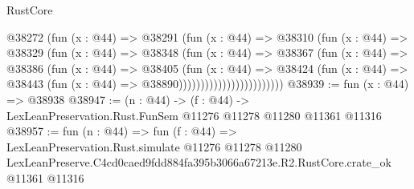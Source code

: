 \begin{lexlean}{RustCore}
\begin{coremodule}
                              @38272
                                (fun (x : @44) =>
                                @38291
                                  (fun (x : @44) =>
                                  @38310
                                    (fun (x : @44) =>
                                    @38329
                                      (fun (x : @44) =>
                                      @38348
                                        (fun (x : @44) =>
                                        @38367
                                          (fun (x : @44) =>
                                          @38386
                                            (fun (x : @44) =>
                                            @38405
                                              (fun (x : @44) =>
                                              @38424
                                                (fun (x : @44) =>
                                                @38443
                                                  (fun (x : @44) => @38890))))))))))))))))))))))))
@38939 := fun (x : @44) => @38938
@38947 := (n : @44) ->
  (f : @44) -> LexLeanPreservation.Rust.FunSem @11276 @11278 @11280 @11361 @11316
@38957 := fun (n : @44) =>
  fun (f : @44) =>
  LexLeanPreservation.Rust.simulate
    @11276
    @11278
    @11280
    LexLeanPreserve.C4cd0caed9fdd884fa395b3066a67213e.R2.RustCore.crate_ok
    @11361
    @11316
\end{coremodule}
\end{lexlean}
